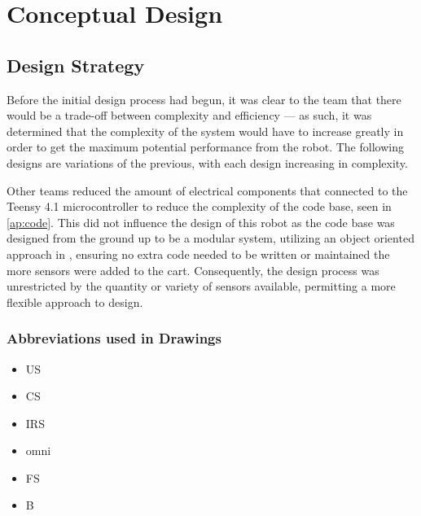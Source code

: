 \documentclass[11pt]{report}
\begin{document}
\chapter{Conceptual Design}\label{ch:conceptual-design}

\section*{Design Strategy}
Before the initial design process had begun, it was clear to the team that there would be a trade-off between complexity and efficiency --- as such, it was determined that the complexity of the system would have to increase greatly in order to get the maximum potential performance from the robot. The following designs are variations of the previous, with each design increasing in complexity.
\par Other teams reduced the amount of electrical components that connected to the Teensy 4.1 microcontroller to reduce the complexity of the code base, seen in \cref{ap:code}. This did not influence the design of this robot as the code base was designed from the ground up to be a modular system, utilizing an object oriented approach in \cplusplus{}, ensuring no extra code needed to be written or maintained the more sensors were added to the cart. Consequently, the design process was unrestricted by the quantity or variety of sensors available, permitting a more flexible approach to design.

\subsection*{Abbreviations used in Drawings}
\begin{itemize}
    \item \gls{US}
    \item \gls{CS}
    \item \gls{IRS}
    \item \gls{omni}
    \item \gls{FS}
    \item \gls{B}
\end{itemize}

\newpage
\end{document}
